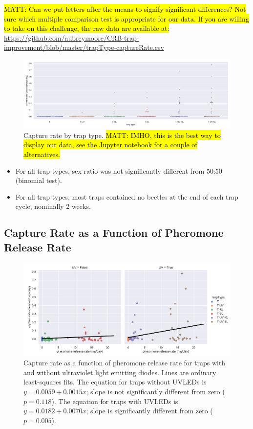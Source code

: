 \documentclass[12pt,letterpaper,english,bibliography=totocnumbered, abstract=on]{scrartcl}
\begin{document}
\hl{
	MATT: Can we put letters after the means to signify significant differences? Not sure which multiple comparison test is appropriate for our data. If you are willing to take on this challenge, the raw data are available at:}\\
\footnotesize{\url{https://github.com/aubreymoore/CRB-trap-improvement/blob/master/trapType-captureRate.csv}}


\begin{figure}[h]
\centering
\includegraphics[width=1\linewidth]{images/trapcatch-swarmplot}
\caption{Capture rate by trap type. \hl{MATT: IMHO, this is the best way to display our data, see the Jupyter notebook for a couple of alternatives.}}
\label{fig:trapcatch-swarmplot}
\end{figure}

\begin{itemize}
	\item For all trap types, sex ratio was not significantly different from 50:50 (binomial test).
	\item For all trap types, most traps contained no beetles at the end of each trap cycle, nominally 2 weeks.
\end{itemize}


\newpage

\subsection{Capture Rate as a Function of Pheromone Release Rate}

\begin{figure}[h]
\centering
\includegraphics[width=1\linewidth]{images/trapcatch-lmplot}
\caption{
	Capture rate as a function of pheromone release rate for traps with and without ultraviolet light emitting diodes.
	Lines are ordinary least-squares fits.	
	The equation for traps without UVLEDs is $y = 0.0059 + 0.0015x$; slope is not significantly different from zero ($p=0.118$).
	The equation for traps with UVLEDs is $y = 0.0182 + 0.0070x$; slope is significantly different from zero ($p=0.005$).
	}
\label{fig:trapcatch-lmplot}
\end{figure}

\printbibliography	
\end{document}
